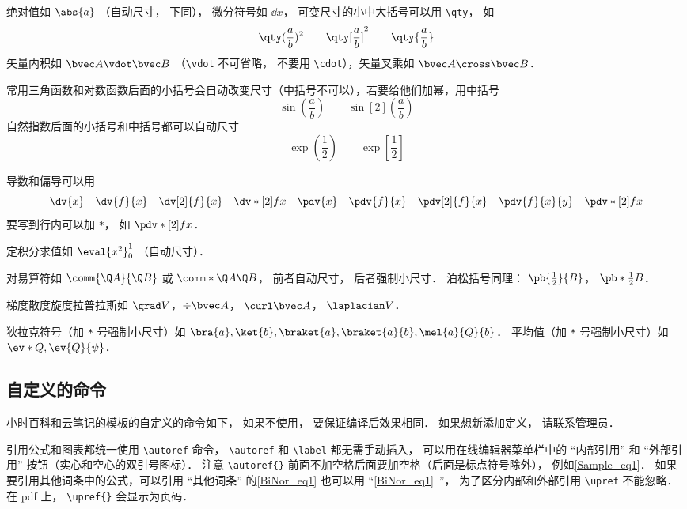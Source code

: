 绝对值如 $\abs{a}$ （自动尺寸， 下同）， 微分符号如 $\dd{x}$， 可变尺寸的小中大括号可以用 \verb|\qty|， 如
\begin{equation}
\qty(\frac ab)^2 \qquad \qty[\frac ab]^2 \qquad \qty{ \frac ab}
\end{equation}
矢量内积如 $\bvec A \vdot \bvec B$ （\verb|\vdot| 不可省略， 不要用 \verb|\cdot|），矢量叉乘如 $\bvec A\cross\bvec B$．

常用三角函数和对数函数后面的小括号会自动改变尺寸（中括号不可以），若要给他们加幂，用中括号
\begin{equation}
\sin(\frac ab) \qquad \sin[2](\frac ab)
\end{equation}
自然指数后面的小括号和中括号都可以自动尺寸
\begin{equation}
\exp(\frac12) \qquad \exp[\frac12]
\end{equation}

导数和偏导可以用
\begin{equation}
\dv{x} \quad \dv{f}{x} \quad \dv[2]{f}{x} \quad \dv*[2]{f}{x} \quad
\pdv{x} \quad \pdv{f}{x} \quad \pdv[2]{f}{x} \quad \pdv{f}{x}{y} \quad \pdv*[2]{f}{x}
\end{equation}
要写到行内可以加 \verb|*|， 如 $\pdv*[2]{f}{x}$．

定积分求值如 $\eval{x^2}_0^1$ （自动尺寸）．

对易算符如 $\comm{\Q A}{\Q B}$ 或 $\comm*{\Q A}{\Q B}$， 前者自动尺寸， 后者强制小尺寸． 泊松括号同理： $\pb{\frac12}{B}$， $\pb*{\frac12}{B}$．

梯度散度旋度拉普拉斯如 $\grad V$，$\div\bvec A$， $\curl\bvec A$， $\laplacian V$．

狄拉克符号（加 \verb|*| 号强制小尺寸）如 $\bra{a}, \ket{b}, \braket{a}, \braket{a}{b}, \mel{a}{Q}{b}$． 平均值（加 \verb|*| 号强制小尺寸）如 $\ev*{Q}, \ev{Q}{\psi}$．

\subsection{自定义的命令}
小时百科和云笔记的模板的自定义的命令如下， 如果不使用， 要保证编译后效果相同． 如果想新添加定义， 请联系管理员．

引用公式和图表都统一使用 \verb|\autoref| 命令， \verb|\autoref| 和 \verb|\label| 都无需手动插入， 可以用在线编辑器菜单栏中的 “内部引用” 和 “外部引用” 按钮（实心和空心的双引号图标）． 注意 \verb|\autoref{}| 前面不加空格后面要加空格（后面是标点符号除外）， 例如\autoref{Sample_eq1}． 如果要引用其他词条中的公式，可以引用 “其他词条” 的\autoref{BiNor_eq1} 也可以用 “\autoref{BiNor_eq1}~”， 为了区分内部和外部引用 \verb|\upref| 不能忽略． 在 pdf 上， \verb|\upref{}| 会显示为页码．

